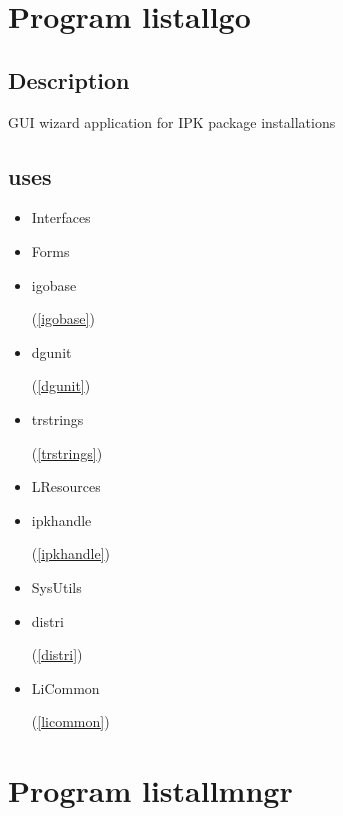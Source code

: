 \documentclass{report}
\begin{document}
\chapter{Program listallgo}
\label{listallgo}
\section{Description}
GUI wizard application for IPK package installations
\section{uses}
\begin{itemize}
\item \begin{ttfamily}Interfaces\end{ttfamily}\item \begin{ttfamily}Forms\end{ttfamily}\item \begin{ttfamily}igobase\end{ttfamily}(\ref{igobase})\item \begin{ttfamily}dgunit\end{ttfamily}(\ref{dgunit})\item \begin{ttfamily}trstrings\end{ttfamily}(\ref{trstrings})\item \begin{ttfamily}LResources\end{ttfamily}\item \begin{ttfamily}ipkhandle\end{ttfamily}(\ref{ipkhandle})\item \begin{ttfamily}SysUtils\end{ttfamily}\item \begin{ttfamily}distri\end{ttfamily}(\ref{distri})\item \begin{ttfamily}LiCommon\end{ttfamily}(\ref{licommon})\end{itemize}
\chapter{Program listallmngr}
\label{listallmngr}
\end{document}
